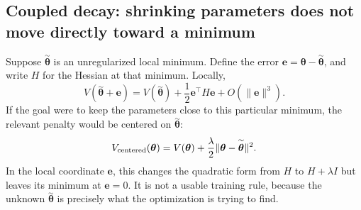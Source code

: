 \documentclass[11pt,letterpaper]{article}
\newcommand{\thet}{\bm{\theta}}
\begin{document}
\subsection{Coupled decay: shrinking parameters does not move directly toward a minimum}

Suppose \(\overset{\sim}{\thet}\) is an unregularized local minimum. Define
the error \(\bm e=\thet-\overset{\sim}{\thet}\), and write \(H\) for the
Hessian at that minimum.
Locally,
\begin{equation}\label{eq:local_quadratic_vector}
  V(\overset{\sim}{\thet}+\bm e)
  =V(\overset{\sim}{\thet})
   +\frac12\bm e^\top H\bm e
   +O(\lVert\bm e\rVert^3).
\end{equation}
If the goal were to keep the parameters close to this particular minimum,
the relevant penalty would be centered on \(\overset{\sim}{\thet}\):
\begin{equation}\label{eq:centered_decay_ideal}
  V_{\rm centered}(\thet)
  =V(\thet)+\frac{\lambda}{2}
   \lVert\thet-\overset{\sim}{\thet}\rVert^2.
\end{equation}
In the local coordinate \(\bm e\), this changes the quadratic form from
\(H\) to \(H+\lambda I\) but leaves its minimum at \(\bm e=0\). It is not a
usable training rule, because the unknown \(\overset{\sim}{\thet}\) is precisely what
the optimization is trying to find.
\end{document}
